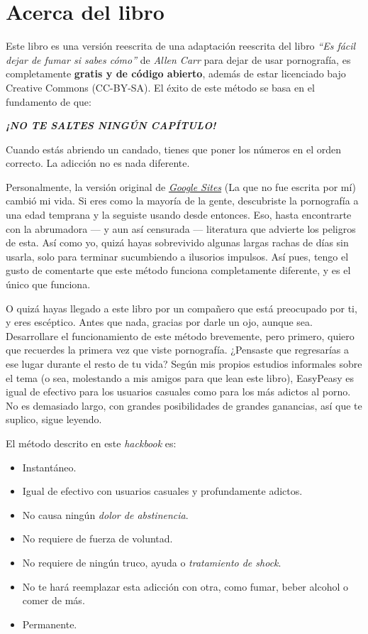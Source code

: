 \documentclass[
  spanish,
  openany]{book}
\providecommand{\tightlist}{%
  \setlength{\itemsep}{0pt}\setlength{\parskip}{0pt}}
\let\oldhref\href
\renewcommand{\href}[2]{\textcolor{blue}{\oldhref{#1}{#2}}}
\begin{document}
\hypertarget{acerca-del-libro}{%
\section*{Acerca del libro}\label{acerca-del-libro}}

Este libro es una versión reescrita de una adaptación reescrita del libro \emph{``Es fácil dejar de fumar si sabes cómo''} de \emph{Allen Carr} para dejar de usar pornografía, es completamente \textbf{gratis y de código abierto}, además de estar licenciado bajo Creative Commons (CC-BY-SA). El éxito de este método se basa en el fundamento de que:

{\emph{\textbf{¡NO TE SALTES NINGÚN CAPÍTULO!}}}

Cuando estás abriendo un candado, tienes que poner los números en el orden correcto. La adicción no es nada diferente.

Personalmente, la versión original de \href{https://sites.google.com/site/sites/system/errors/WebspaceNotFound?path=\%2Fhackbookeasypeasy}{\emph{Google Sites}} (La que no fue escrita por mí) cambió mi vida. Si eres como la mayoría de la gente, descubriste la pornografía a una edad temprana y la seguiste usando desde entonces. Eso, hasta encontrarte con la abrumadora --- y aun así censurada --- literatura que advierte los peligros de esta. Así como yo, quizá hayas sobrevivido algunas largas rachas de días sin usarla, solo para terminar sucumbiendo a ilusorios impulsos. Así pues, tengo el gusto de comentarte que este método funciona completamente diferente, y es el único que funciona.

O quizá hayas llegado a este libro por un compañero que está preocupado por ti, y eres escéptico. Antes que nada, gracias por darle un ojo, aunque sea. Desarrollare el funcionamiento de este método brevemente, pero primero, quiero que recuerdes la primera vez que viste pornografía. ¿Pensaste que regresarías a ese lugar durante el resto de tu vida? Según mis propios estudios informales sobre el tema (o sea, molestando a mis amigos para que lean este libro), EasyPeasy es igual de efectivo para los usuarios casuales como para los más adictos al porno. No es demasiado largo, con grandes posibilidades de grandes ganancias, así que te suplico, sigue leyendo.

El método descrito en este \emph{hackbook} es:

\begin{itemize}
\tightlist
\item
  Instantáneo.
\item
  Igual de efectivo con usuarios casuales y profundamente adictos.
\item
  No causa ningún \emph{dolor de abstinencia}.
\item
  No requiere de fuerza de voluntad.
\item
  No requiere de ningún truco, ayuda o \emph{tratamiento de shock}.
\item
  No te hará reemplazar esta adicción con otra, como fumar, beber alcohol o comer de más.
\item
  Permanente.
\end{itemize}
\end{document}
